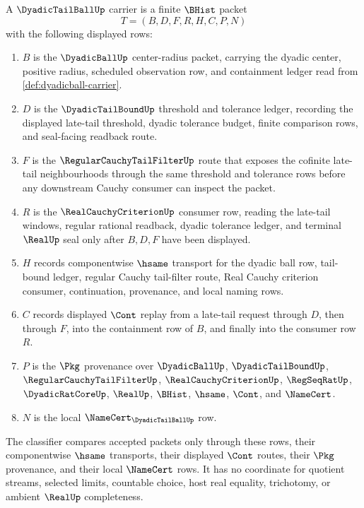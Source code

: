 \begin{definition}
\label{def:dyadic-tail-ball-carrier}
A $\DyadicTailBallUp$ carrier is a finite $\BHist$ packet
$$
T=(B,D,F,R,H,C,P,N)
$$
with the following displayed rows:
\begin{enumerate}
\item $B$ is the $\DyadicBallUp$ center-radius packet, carrying the dyadic center, positive radius, scheduled observation row, and containment ledger read from \autoref{def:dyadicball-carrier}.
\item $D$ is the $\DyadicTailBoundUp$ threshold and tolerance ledger, recording the displayed late-tail threshold, dyadic tolerance budget, finite comparison rows, and seal-facing readback route.
\item $F$ is the $\RegularCauchyTailFilterUp$ route that exposes the cofinite late-tail neighbourhoods through the same threshold and tolerance rows before any downstream Cauchy consumer can inspect the packet.
\item $R$ is the $\RealCauchyCriterionUp$ consumer row, reading the late-tail windows, regular rational readback, dyadic tolerance ledger, and terminal $\RealUp$ seal only after $B,D,F$ have been displayed.
\item $H$ records componentwise $\hsame$ transport for the dyadic ball row, tail-bound ledger, regular Cauchy tail-filter route, Real Cauchy criterion consumer, continuation, provenance, and local naming rows.
\item $C$ records displayed $\Cont$ replay from a late-tail request through $D$, then through $F$, into the containment row of $B$, and finally into the consumer row $R$.
\item $P$ is the $\Pkg$ provenance over $\DyadicBallUp$, $\DyadicTailBoundUp$, $\RegularCauchyTailFilterUp$, $\RealCauchyCriterionUp$, $\RegSeqRatUp$, $\DyadicRatCoreUp$, $\RealUp$, $\BHist$, $\hsame$, $\Cont$, and $\NameCert$.
\item $N$ is the local $\NameCert_{\DyadicTailBallUp}$ row.
\end{enumerate}
The classifier compares accepted packets only through these rows, their componentwise $\hsame$ transports, their displayed $\Cont$ routes, their $\Pkg$ provenance, and their local $\NameCert$ rows. It has no coordinate for quotient streams, selected limits, countable choice, host real equality, trichotomy, or ambient $\RealUp$ completeness.
\end{definition}

